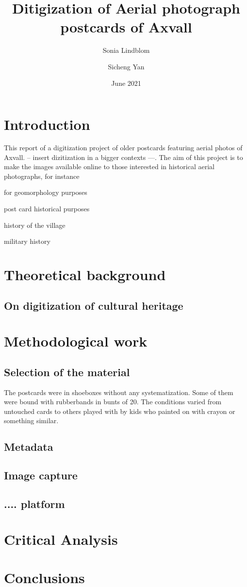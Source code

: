 \documentclass[12 pt]{paper}
\title{%
Ditigization of Aerial photograph postcards of Axvall  }
\author{Sonia Lindblom \and Sicheng Yan}
\date{June 2021}
\begin{document}


\section{Introduction}
This report of a digitization project of older postcards featuring aerial photos of Axvall. -- insert dizitization in a bigger contexts ---. The aim of this project is to make the images available online to those interested in historical aerial photographs, for instance 
\begin{inparaenum}[i)]
	\item for geomorphology purposes \autocite[cf.][]{gomez2015}
	\item post card historical purposes
	\item history of the village
	\item military history
\end{inparaenum}
\section{Theoretical background}
\subsection{On digitization of cultural heritage}

\autocite{manning2008}
\section{Methodological work}%
\subsection{Selection of the material}

The postcards were in shoeboxes without any systematization. Some of them were bound with rubberbands in bunts of 20. The conditions varied from untouched cards to others played with by kids who painted on with crayon or something similar. 
\subsection{Metadata}
\subsection{Image capture}
\subsection{.... platform}%

\section {Critical Analysis}


\section{Conclusions}


\newpage

%
%
\printbibliography
\end{document}
